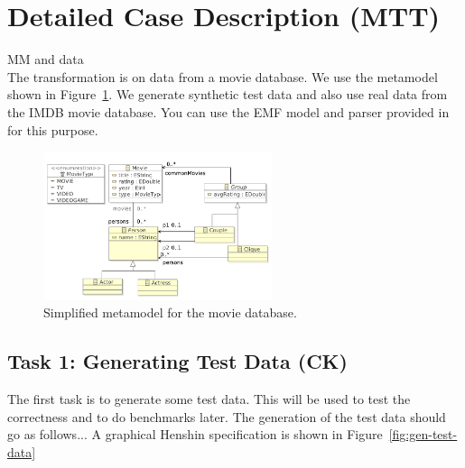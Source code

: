 \documentclass[a4paper]{article}
\begin{document}
\section{Detailed Case Description (MTT)}\label{sec-case}

MM and data\\

The transformation is on data from a movie database.
We use the metamodel shown in Figure~\ref{fig:metamodel}.
We generate synthetic test data and also use real data
from the IMDB movie database. You can use the EMF model and
parser provided in \cite{IMDB2EMF} for this purpose.


\begin{figure}[ht]
\centering
\includegraphics[width=0.6\textwidth]{movies}
\caption{Simplified metamodel for the movie database.}
\label{fig:metamodel}
\end{figure}

\subsection{Task 1: Generating Test Data (CK)}
\label{sec:gen-test-data}

The first task is to generate some test data.
This will be used to test the correctness and to do benchmarks later.
The generation of the test data should go as follows...
A graphical Henshin specification is shown in Figure~\ref{fig:gen-test-data}
\end{document}
